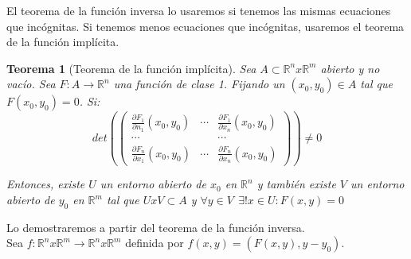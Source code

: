 \documentclass[11pt, a4paper, titlepage]{article}
\makeatletter
\renewenvironment{proof}[1][\proofname] {\vspace{-15pt}\par\pushQED{\qed}\normalfont\topsep6\p@\@plus6\p@\relax\trivlist\item[\hskip\labelsep\it#1\@addpunct{.}]\ignorespaces}{\popQED\endtrivlist\@endpefalse}
\newcommand{\R}{\mathbb{R}}
\theoremstyle{theorem-style}
\newtheorem*{nth}{Teorema}
\theoremstyle{definition-style}
\theoremstyle{remark-style}
\theoremstyle{example-style}
\makeatother
\begin{document}
El teorema de la función inversa lo usaremos si tenemos las mismas ecuaciones que incógnitas. Si tenemos menos ecuaciones que incógnitas, usaremos el teorema de la función implícita.

\begin{nth}[Teorema de la función implícita]
	Sea $A \subset \R^n x\R^m$ abierto y no vacío. Sea $F: A \to \R^n$ una función de clase 1. Fijando un $(x_0,y_0) \in A$ tal que $F(x_0,y_0) = 0$. Si:
	\[
	det(\begin{pmatrix}
 \frac{\partial F_1}{\partial n_1}(x_0,y_0) & \cdots & \frac{\partial F_1}{\partial x_n}(x_0,y_0) \\
 \cdots& & \cdots\\
 
 \frac{\partial F_n}{\partial x_1}(x_0,y_0) & \cdots & \frac{\partial F_n}{\partial x_n} (x_0,y_0)
\end{pmatrix}) \ne 0
	\]
	
	Entonces, existe $U$ un entorno abierto de $x_0$ en $\R^n$ y también existe $V$ un entorno abierto de $y_0$ en $\R^m$ tal que $UxV \subset A$ y $\forall y \in V \ \ \exists! x \in U : F(x,y) = 0$
\end{nth}
\begin{proof}
	Lo demostraremos a partir del teorema de la función inversa.\\
	Sea $f:\R^nx\R^m \to \R^nx\R^m$ definida por $f(x,y) = (F(x,y),y-y_0)$.
\end{proof}
\end{document}
